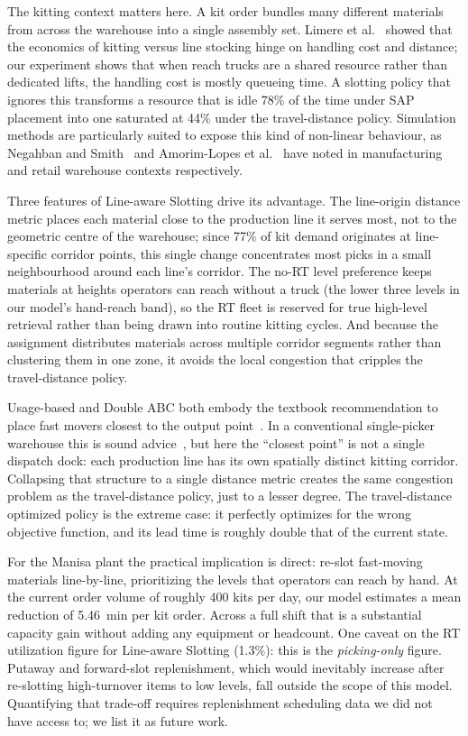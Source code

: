 The kitting context matters here.  A kit order bundles many different
materials from across the warehouse into a single assembly set.  Limere
et al.~\cite{limere2012} showed that the economics of kitting versus
line stocking hinge on handling cost and distance; our experiment shows
that when reach trucks are a shared resource rather than dedicated
lifts, the handling cost is mostly queueing time.  A slotting policy
that ignores this transforms a resource that is idle 78\% of the time
under SAP placement into one saturated at 44\% under the
travel-distance policy.  Simulation methods are particularly suited to
expose this kind of non-linear behaviour, as Negahban and
Smith~\cite{negahban2014} and Amorim-Lopes et al.~\cite{amorim2021}
have noted in manufacturing and retail warehouse contexts respectively.

Three features of Line-aware Slotting drive its advantage.  The
line-origin distance metric places each material close to the
production line it serves most, not to the geometric centre of the
warehouse; since 77\% of kit demand originates at line-specific
corridor points, this single change concentrates most picks in a small
neighbourhood around each line's corridor.  The no-RT level preference
keeps materials at heights operators can reach without a truck (the
lower three levels in our model's hand-reach band), so the RT fleet is reserved for
true high-level retrieval rather than being drawn into routine kitting
cycles.  And because the assignment distributes materials across
multiple corridor segments rather than clustering them in one zone, it
avoids the local congestion that cripples the travel-distance policy.

Usage-based and Double ABC both embody the textbook recommendation to
place fast movers closest to the output point~\cite{hausman1976,
heskett1963}.  In a conventional single-picker warehouse this is sound
advice~\cite{frazelle2002}, but here the ``closest point'' is not a
single dispatch dock: each production line has its own spatially
distinct kitting corridor.  Collapsing that structure to a single
distance metric creates the same congestion problem as the
travel-distance policy, just to a lesser degree.  The
travel-distance optimized policy is the extreme case: it perfectly
optimizes for the wrong objective function, and its lead time is
roughly double that of the current state.

For the Manisa plant the practical implication is direct: re-slot
fast-moving materials line-by-line, prioritizing the levels that
operators can reach by hand.  At the current order volume of roughly
400 kits per day, our model estimates a mean reduction of 5.46~min per
kit order.  Across a full shift that is a substantial capacity gain
without adding any equipment or headcount.  One caveat on the RT
utilization figure for Line-aware Slotting (1.3\%): this is the
\emph{picking-only} figure.  Putaway and forward-slot replenishment,
which would inevitably increase after re-slotting high-turnover items
to low levels, fall outside the scope of this model.  Quantifying that
trade-off requires replenishment scheduling data we did not have access
to; we list it as future work.

